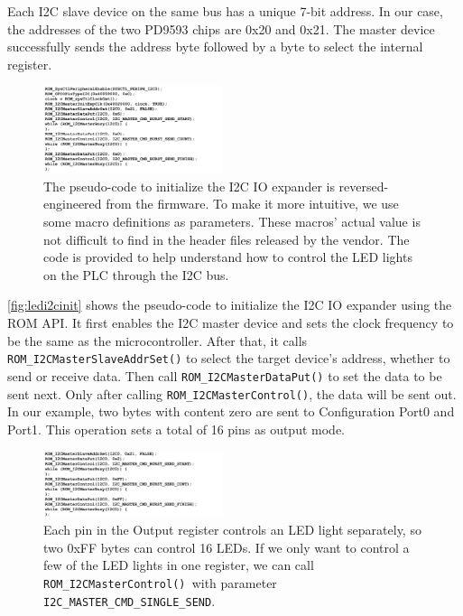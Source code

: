 Each I2C slave device on the same bus has a unique 7-bit address. In our case, the addresses of the two PD9593 chips are 0x20 and 0x21. %
The master device successfully sends the address byte followed by a byte to select the internal register. 




\begin{figure}[tp!]
	\includegraphics[width=0.47\textwidth]{figures/ledi2cinit}
	\centering
	\caption{The pseudo-code to initialize the I2C IO expander is reversed-engineered from the firmware. To make it more intuitive, we use some macro definitions as parameters. These macros' actual value is not difficult to find in the header files released by the vendor. The code is provided to help understand how to control the LED lights on the PLC through the I2C bus.}
	\label{fig:ledi2cinit}
\end{figure}


\autoref{fig:ledi2cinit} shows the pseudo-code to initialize the I2C IO expander using the ROM API. It first enables the I2C master device and sets the clock frequency to be the same as the microcontroller. After that, it calls \texttt{ROM\_I2CMasterSlaveAddrSet()} to select the target device's address, whether to send or receive data. Then call \texttt{ROM\_I2CMasterDataPut()} to set the data to be sent next. Only after calling \texttt{ROM\_I2CMasterControl()}, the data will be sent out. In our example, two bytes with content zero are sent to Configuration Port0 and Port1. This operation sets a total of 16 pins as output mode.

\begin{figure}[tp!]
	\includegraphics[width=0.47\textwidth]{figures/ledi2csend}
	\centering
	\caption{Each pin in the Output register controls an LED light separately, so two 0xFF bytes can control 16 LEDs. If we only want to control a few of the LED lights in one register, we can call \texttt{ROM\_I2CMasterControl() }with parameter \texttt{I2C\_MASTER\_CMD\_SINGLE\_SEND}.}
	\label{fig:ledi2csend}
\end{figure}

